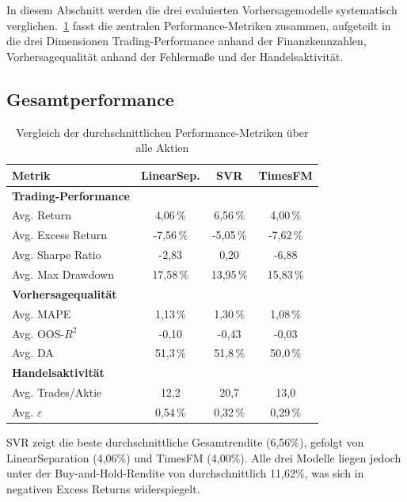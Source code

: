 In diesem Abschnitt werden die drei evaluierten Vorhersagemodelle systematisch verglichen.~\cref{tab:model_comparison} fasst die zentralen Performance-Metriken zusammen, aufgeteilt in die drei Dimensionen Trading-Performance anhand der Finanzkennzahlen, Vorhersagequalität anhand der Fehlermaße und der Handelsaktivität.

\subsection{Gesamtperformance}\label{sec:vgl_performance}
\begin{table}[htbp]
    \centering
    \begin{tabular}{l c c c}
        \toprule
        Metrik             & LinearSep. & SVR       & TimesFM   \\
        \midrule
        \textbf{Trading-Performance}                            \\
        Avg. Return        & 4,06\,\%   & 6,56\,\%  & 4,00\,\%  \\
        Avg. Excess Return & -7,56\,\%  & -5,05\,\% & -7,62\,\% \\
        Avg. Sharpe Ratio  & -2,83      & 0,20      & -6,88     \\
        Avg. Max Drawdown  & 17,58\,\%  & 13,95\,\% & 15,83\,\% \\
        \midrule
        \textbf{Vorhersagequalität}                             \\
        Avg. MAPE          & 1,13\,\%   & 1,30\,\%  & 1,08\,\%  \\
        Avg. OOS-$R^2$     & -0,10      & -0,43     & -0,03     \\
        Avg. DA            & 51,3\,\%   & 51,8\,\%  & 50,0\,\%  \\
        \midrule
        \textbf{Handelsaktivität}                               \\
        Avg. Trades/Aktie  & 12,2       & 20,7      & 13,0      \\
        Avg. $\varepsilon$ & 0,54\,\%   & 0,32\,\%  & 0,29\,\%  \\
        \bottomrule
    \end{tabular}
    \caption{Vergleich der durchschnittlichen Performance-Metriken über alle Aktien}\label{tab:model_comparison}
\end{table}

SVR zeigt die beste durchschnittliche Gesamtrendite (6,56\%), gefolgt von LinearSeparation (4,06\%) und TimesFM (4,00\%). Alle drei Modelle liegen jedoch unter der Buy-and-Hold-Rendite von durchschnittlich 11,62\%, was sich in negativen Excess Returns widerspiegelt.

